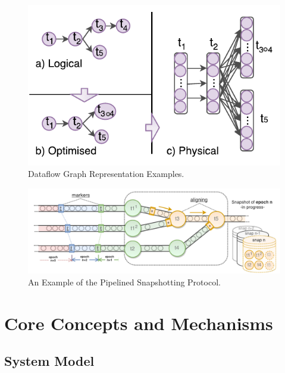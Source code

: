 \begin{figure}[h]
\centering
\includegraphics[width=\textwidth / 2]{figures/graphs.pdf}
\caption{Dataflow Graph Representation Examples.} 
\label{fig:graphs}
\vspace{-4mm}
\end{figure}

\begin{figure}[t!]
\centering
\includegraphics[width=\textwidth]{figures/snapshots-overview.pdf}
\caption{An Example of the Pipelined Snapshotting Protocol.} 
\label{fig:snapshots-overview}
\vspace{-4mm}
\end{figure}


\section{Core Concepts and Mechanisms}
\label{sec:core}

\subsection{System Model}


